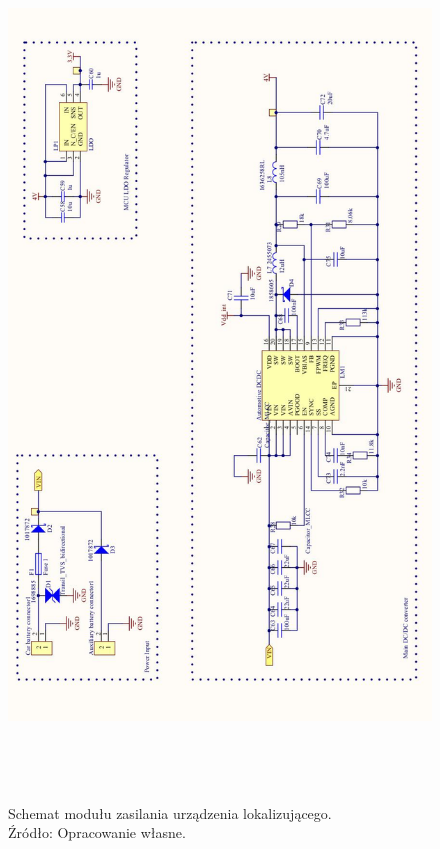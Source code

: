 \begin{figure}[H]
	\centering
	\includegraphics[width=16cm, height=23cm]{img/schematics/mainboard_power.jpg}
	\caption{Schemat modułu zasilania urządzenia lokalizującego. \\ Źródło: Opracowanie własne.}
	\label{fig:image_mainboard_power_schematic}
\end{figure}


